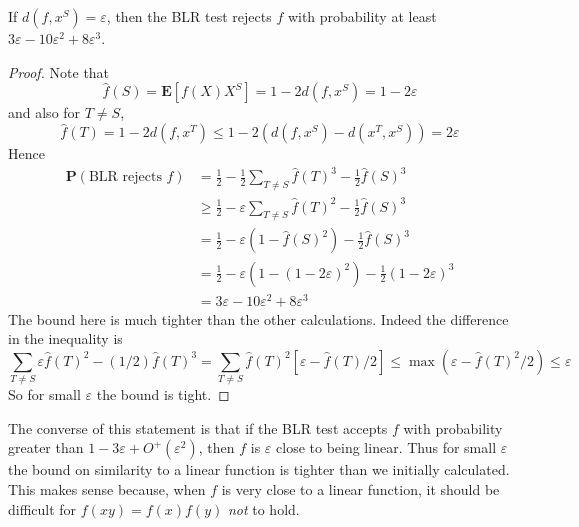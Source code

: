 \begin{theorem}
    If $d(f,x^S) = \varepsilon$, then the BLR test rejects $f$ with probability at least $3\varepsilon - 10 \varepsilon^2 + 8 \varepsilon^3$.
\end{theorem}
\begin{proof}
    Note that
    \[ \widehat{f}(S) = \mathbf{E}[f(X)X^S] = 1 - 2d(f,x^S) = 1 - 2\varepsilon \]
    and also for $T \neq S$,
    \[ \widehat{f}(T) = 1 - 2d(f,x^T) \leq 1 - 2(d(f,x^S) - d(x^T,x^S)) = 2 \varepsilon \]
    Hence
    \begin{align*}
        \mathbf{P}(\text{BLR rejects $f$}) &= \frac{1}{2} - \frac{1}{2} \sum_{T \neq S} \widehat{f}(T)^3  - \frac{1}{2} \widehat{f}(S)^3\\
        &\geq \frac{1}{2}  - \varepsilon \sum_{T \neq S} \widehat{f}(T)^2 - \frac{1}{2} \widehat{f}(S)^3\\
        &= \frac{1}{2} - \varepsilon (1 - \widehat{f}(S)^2) - \frac{1}{2} \widehat{f}(S)^3\\
        &= \frac{1}{2} - \varepsilon (1 - (1 - 2 \varepsilon)^2) - \frac{1}{2} (1 - 2\varepsilon)^3\\
        &=  3\varepsilon - 10 \varepsilon^2 + 8 \varepsilon^3
    \end{align*}
    The bound here is much tighter than the other calculations. Indeed the difference in the inequality is
    \[ \sum_{T \neq S} \varepsilon \widehat{f}(T)^2 - (1/2) \widehat{f}(T)^3 = \sum_{T \neq S} \widehat{f}(T)^2 [\varepsilon - \widehat{f}(T)/2] \leq \max(\varepsilon - \widehat{f}(T)^2/2) \leq \varepsilon \]
    So for small $\varepsilon$ the bound is tight.
\end{proof}

The converse of this statement is that if the BLR test accepts $f$ with probability greater than $1 - 3\varepsilon + O^+(\varepsilon^2)$, then $f$ is $\varepsilon$ close to being linear. Thus for small $\varepsilon$ the bound on similarity to a linear function is tighter than we initially calculated. This makes sense because, when $f$ is very close to a linear function, it should be difficult for $f(xy) = f(x)f(y)$ {\it not} to hold.

